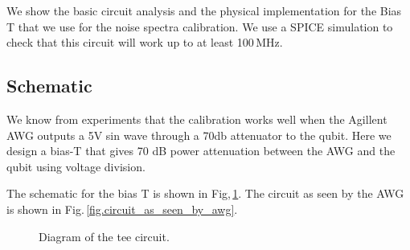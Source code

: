 %
%

%


We show the basic circuit analysis and the physical implementation for the Bias T that we use for the noise spectra calibration.  We use a SPICE simulation to check that this circuit will work up to at least 100\,MHz.

\subsection{Schematic}

We know from experiments that the calibration works well when the Agillent AWG outputs a 5V sin wave through a 70db attenuator to the qubit.
Here we design a bias-T that gives 70 dB power attenuation between the AWG and the qubit using voltage division.  

The schematic for the bias T is shown in Fig,\,\ref{fig.circuit_diagram}.
The circuit as seen by the AWG is shown in Fig.\,\ref{fig.circuit_as_seen_by_awg}.

\begin{figure}[ht]
\begin{centering}
\par\end{centering}
\caption{Diagram of the tee circuit.}
\label{fig.circuit_diagram}
\end{figure}

